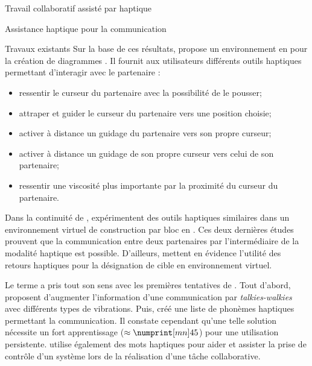 \documentclass[myfrancais,ngerman,english,french]{mythesis}
\begin{document}
\begin{mychapter}{Travail collaboratif assisté par haptique}
\begin{mysection}{Assistance haptique pour la communication}
\begin{mysubsection}{Travaux existants}
				Sur la base de ces résultats,  propose un environnement en \myTwoD pour la création de diagrammes .
				Il fournit aux utilisateurs différents outils haptiques permettant d'interagir avec le partenaire :
				\begin{itemize}
					\item ressentir le curseur du partenaire avec la possibilité de le pousser;
					\item attraper et guider le curseur du partenaire vers une position choisie;
					\item activer à distance un guidage du partenaire vers son propre curseur;
					\item activer à distance un guidage de son propre curseur vers celui de son partenaire;
					\item ressentir une viscosité plus importante par la proximité du curseur du partenaire.
				\end{itemize}

				Dans la continuité de ,  expérimentent des outils haptiques similaires dans un environnement virtuel de construction par bloc en \myThreeD.
				Ces deux dernières études prouvent que la communication entre deux partenaires par l'intermédiaire de la modalité haptique est possible.
				D'ailleurs,  mettent en évidence l'utilité des retours haptiques pour la désignation de cible en environnement virtuel.

				Le terme  a pris tout son sens avec les premières tentatives de .
				Tout d'abord,  proposent d'augmenter l'information d'une communication par \textit{talkies-walkies} avec différents types de vibrations.
				Puis,  créé une liste de phonèmes haptiques permettant la communication.
				Il constate cependant qu'une telle solution nécessite un fort apprentissage ($\approx \mynum[mn]{45}$) pour une utilisation persistente.
				 utilise également des mots haptiques pour aider et assister la prise de contrôle d'un système lors de la réalisation d'une tâche collaborative.


\end{mysubsection}
\end{mysection}
\end{mychapter}
\end{document}
